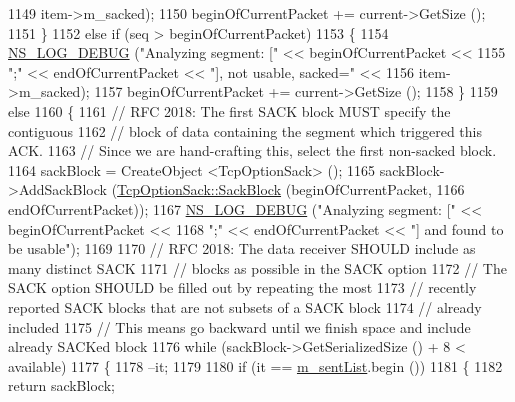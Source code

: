 \begin{DoxyCode}
1149                         item->m\_sacked);
1150           beginOfCurrentPacket += current->GetSize ();
1151         \}
1152       \textcolor{keywordflow}{else} \textcolor{keywordflow}{if} (seq > beginOfCurrentPacket)
1153         \{
1154           \hyperlink{group__logging_ga413f1886406d49f59a6a0a89b77b4d0a}{NS\_LOG\_DEBUG} (\textcolor{stringliteral}{"Analyzing segment: ["} << beginOfCurrentPacket <<
1155                         \textcolor{stringliteral}{";"} << endOfCurrentPacket << \textcolor{stringliteral}{"], not usable, sacked="} <<
1156                         item->m\_sacked);
1157           beginOfCurrentPacket += current->GetSize ();
1158         \}
1159       \textcolor{keywordflow}{else}
1160         \{
1161           \textcolor{comment}{// RFC 2018: The first SACK block MUST specify the contiguous}
1162           \textcolor{comment}{// block of data containing the segment which triggered this ACK.}
1163           \textcolor{comment}{// Since we are hand-crafting this, select the first non-sacked block.}
1164           sackBlock = CreateObject <TcpOptionSack> ();
1165           sackBlock->AddSackBlock (\hyperlink{classns3_1_1TcpOptionSack_a9e1d07d8729fd3ac5ead7305794675c3}{TcpOptionSack::SackBlock} (beginOfCurrentPacket,
1166                                                              endOfCurrentPacket));
1167           \hyperlink{group__logging_ga413f1886406d49f59a6a0a89b77b4d0a}{NS\_LOG\_DEBUG} (\textcolor{stringliteral}{"Analyzing segment: ["} << beginOfCurrentPacket <<
1168                         \textcolor{stringliteral}{";"} << endOfCurrentPacket << \textcolor{stringliteral}{"] and found to be usable"});
1169 
1170           \textcolor{comment}{// RFC 2018: The data receiver SHOULD include as many distinct SACK}
1171           \textcolor{comment}{// blocks as possible in the SACK option}
1172           \textcolor{comment}{// The SACK option SHOULD be filled out by repeating the most}
1173           \textcolor{comment}{// recently reported SACK blocks  that are not subsets of a SACK block}
1174           \textcolor{comment}{// already included}
1175           \textcolor{comment}{// This means go backward until we finish space and include already SACKed block}
1176           \textcolor{keywordflow}{while} (sackBlock->GetSerializedSize () + 8 < available)
1177             \{
1178               --it;
1179 
1180               \textcolor{keywordflow}{if} (it == \hyperlink{classns3_1_1TcpTxBuffer_ae131f4743f4537f3606db664874440e5}{m\_sentList}.begin ())
1181                 \{
1182                   \textcolor{keywordflow}{return} sackBlock;

\end{DoxyCode}
